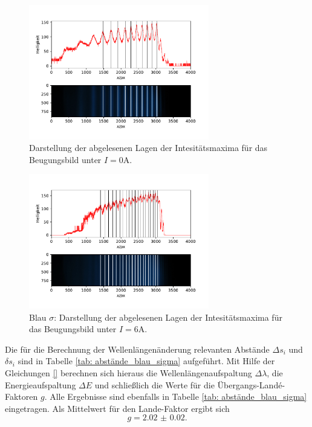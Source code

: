 \begin{figure}
  \centering
  \includegraphics[width = 0.7\textwidth]{../Messdaten/plots/peaks_blau_sigma_0.pdf}
  \caption{Darstellung der abgelesenen Lagen der Intesitätsmaxima für das Beugungsbild unter $I =0$A.}
  \label{fig: peaks_blau_0}
\end{figure}
\begin{figure}
  \centering
  \includegraphics[width = 0.7\textwidth]{../Messdaten/plots/peaks_blau_sigma_6.pdf}
  \caption{Blau $\sigma$: Darstellung der abgelesenen Lagen der Intesitätsmaxima für das Beugungsbild unter $I =6$A.}
  \label{fig: peaks_blau_sigma_6}
\end{figure}
Die für die Berechnung der Wellenlängenänderung relevanten Abstände $\Delta s_i$ und $\delta s_i$ sind in Tabelle \ref{tab: abstände_blau_sigma}
aufgeführt. Mit Hilfe der Gleichungen \eqref{} berechnen sich hieraus die Wellenlängenaufspaltung $\Delta \lambda$, die
Energieaufspaltung $\Delta E$ und schließlich die Werte für die Übergangs-Landé-Faktoren $g$. Alle Ergebnisse sind ebenfalls in
Tabelle \ref{tab: abstände_blau_sigma} eingetragen. Als Mittelwert für den Lande-Faktor ergibt sich
\begin{equation}
  g = \num{2.02(2)}.
\end{equation}

